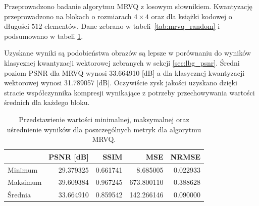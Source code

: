 \documentclass{article}
\begin{document}
Przeprowadzono badanie algorytmu MRVQ z losowym słownikiem. Kwantyzację przeprowadzono na blokach o rozmiarach $4 \times 4$ oraz dla książki
kodowej o długości $512$ elementów. Dane zebrano w \mbox{tabeli \ref{tab:mrvq_random}} i podsumowano w tabeli \mbox{\ref{tab:mrvq_summary}}.

Uzyskane wyniki są podobieństwa obrazów są lepsze w porównaniu do wyników klasycznej kwantyzacji wektorowej zebranych w sekcji \ref{sec:lbg_psnr}. Średni poziom PSNR dla MRVQ wynosi 33.664910 [dB] a dla klasycznej kwantyzacji wektorowej wynosi 31.789057 [dB]. Oczywiście zysk jakości uzyskano dzięki stracie współczynnika kompresji wynikające z potrzeby przechowywania wartości średnich dla każdego bloku.

\begin{table}[h]
  \caption{Przedstawienie wartości minimalnej, maksymalnej oraz uśrednienie wyników dla poszczególnych metryk dla algorytmu MRVQ.}
  \label{tab:mrvq_summary}
  \centering
  \begin{tabular}{@{}lrrrr@{}}
    \toprule
             & PSNR {[}dB{]} & SSIM     & MSE        & NRMSE    \\ \midrule
    Minimum  & 29.379325     & 0.661741 & 8.685005   & 0.022933 \\
    Maksimum & 39.609384     & 0.967245 & 673.800110 & 0.388628 \\
    Średnia  & 33.664910     & 0.859542 & 142.266146 & 0.090000 \\
    \bottomrule
  \end{tabular}
\end{table}
\end{document}
